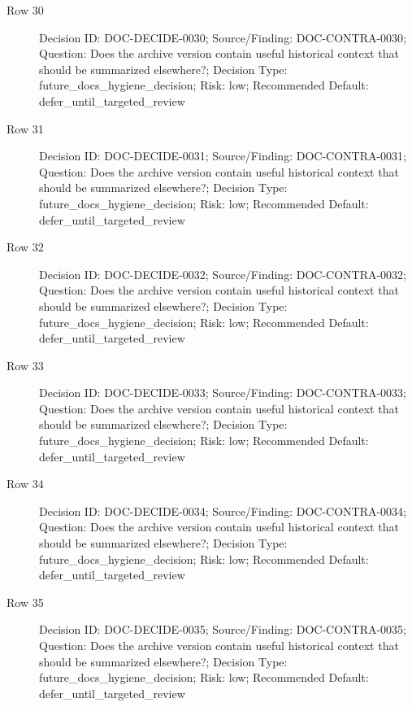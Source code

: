 \documentclass[9pt,a4paper,openany]{book}
\begin{document}
\begin{description}
\item[Row 30] Decision ID: DOC-\allowbreak{}DECIDE-\allowbreak{}0030; Source/\allowbreak{}Finding: DOC-\allowbreak{}CONTRA-\allowbreak{}0030; Question: Does the archive version contain useful historical context that should be summarized elsewhere?; Decision Type: future\_\allowbreak{}docs\_\allowbreak{}hygiene\_\allowbreak{}decision; Risk: low; Recommended Default: defer\_\allowbreak{}until\_\allowbreak{}targeted\_\allowbreak{}review
\item[Row 31] Decision ID: DOC-\allowbreak{}DECIDE-\allowbreak{}0031; Source/\allowbreak{}Finding: DOC-\allowbreak{}CONTRA-\allowbreak{}0031; Question: Does the archive version contain useful historical context that should be summarized elsewhere?; Decision Type: future\_\allowbreak{}docs\_\allowbreak{}hygiene\_\allowbreak{}decision; Risk: low; Recommended Default: defer\_\allowbreak{}until\_\allowbreak{}targeted\_\allowbreak{}review
\item[Row 32] Decision ID: DOC-\allowbreak{}DECIDE-\allowbreak{}0032; Source/\allowbreak{}Finding: DOC-\allowbreak{}CONTRA-\allowbreak{}0032; Question: Does the archive version contain useful historical context that should be summarized elsewhere?; Decision Type: future\_\allowbreak{}docs\_\allowbreak{}hygiene\_\allowbreak{}decision; Risk: low; Recommended Default: defer\_\allowbreak{}until\_\allowbreak{}targeted\_\allowbreak{}review
\item[Row 33] Decision ID: DOC-\allowbreak{}DECIDE-\allowbreak{}0033; Source/\allowbreak{}Finding: DOC-\allowbreak{}CONTRA-\allowbreak{}0033; Question: Does the archive version contain useful historical context that should be summarized elsewhere?; Decision Type: future\_\allowbreak{}docs\_\allowbreak{}hygiene\_\allowbreak{}decision; Risk: low; Recommended Default: defer\_\allowbreak{}until\_\allowbreak{}targeted\_\allowbreak{}review
\item[Row 34] Decision ID: DOC-\allowbreak{}DECIDE-\allowbreak{}0034; Source/\allowbreak{}Finding: DOC-\allowbreak{}CONTRA-\allowbreak{}0034; Question: Does the archive version contain useful historical context that should be summarized elsewhere?; Decision Type: future\_\allowbreak{}docs\_\allowbreak{}hygiene\_\allowbreak{}decision; Risk: low; Recommended Default: defer\_\allowbreak{}until\_\allowbreak{}targeted\_\allowbreak{}review
\item[Row 35] Decision ID: DOC-\allowbreak{}DECIDE-\allowbreak{}0035; Source/\allowbreak{}Finding: DOC-\allowbreak{}CONTRA-\allowbreak{}0035; Question: Does the archive version contain useful historical context that should be summarized elsewhere?; Decision Type: future\_\allowbreak{}docs\_\allowbreak{}hygiene\_\allowbreak{}decision; Risk: low; Recommended Default: defer\_\allowbreak{}until\_\allowbreak{}targeted\_\allowbreak{}review

\end{description}
\end{document}
